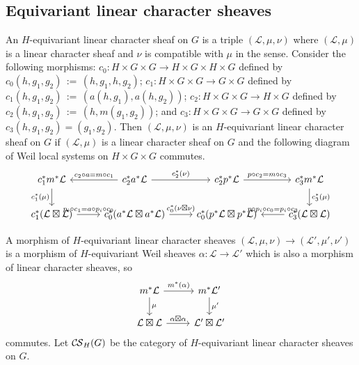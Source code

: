 \documentclass[10pt]{amsart}
\theoremstyle{plain}
\theoremstyle{definition}
\newcommand{\ceq}{{\, :=\, }}
\newcommand{\cs}[1]{{\mathcal{#1}}}
\newcommand{\CS}{{\mathcal{C\hskip-0.8pt S}}}
\begin{document}
\subsection{Equivariant linear character sheaves}

An $H$-equivariant linear character sheaf on $G$ is a triple $(\cs{L},\mu, \nu)$ where $(\cs{L},\mu)$ is a linear character sheaf and $\nu$ is compatible with $\mu$ in the sense. 
Consider the following morphisms: $c_0 : H\times G \times G\to H\times G \times H \times G$ defined by $c_0(h,g_1,g_2)\ceq(h,g_1,h,g_2)$;
$c_1 : H \times G\times G \to G\times G$ defined by $c_1(h, g_1, g_2) \ceq (a(h,g_1),a(h,g_2))$;  $c_2 : H \times G\times G \to H\times G$ defined by $c_2(h,g_1,g_2) \ceq (h, m(g_1,g_2))$; and $c_3 : H \times G\times G \to G\times G$ defined by $c_3(h, g_1, g_2) = (g_1, g_2)$. 
Then $(\cs{L},\mu,\nu)$ is an $H$-equivariant linear character sheaf on $G$ if $(\cs{L},\mu)$ is a linear character sheaf on $G$ and the following diagram of Weil local systems on $H \times G\times G$ commutes.
\[
\begin{tikzcd}
\arrow{d}[swap]{c_1^*(\mu)} c_1^* m^* \cs{L} & \arrow{l}[swap]{c_2\circ a = m\circ c_1}  c_2^* a^* \cs{L} \arrow{r}{c_2^*(\nu)} & c_2^* p^* \cs{L} \arrow{r}{p\circ c_2 = m\circ c_3}  & c_3^* m^*\cs{L} \arrow{d}{c_3^*(\mu)} \\
c_1^*(\cs{L}\boxtimes \cs{L}) \arrow{r}{p_i\circ c_1 = a\circ p_i\circ c_0} & c_0^*(a^*\cs{L}\boxtimes a^*\cs{L}) \arrow{r}{c_0^*(\nu\boxtimes \nu)} & c_0^*(p^*\cs{L} \boxtimes p^*\cs{L}) & \arrow{l}[swap]{p\circ p_i\circ c_0 = p_i \circ c_3}c_3^*(\cs{L}\boxtimes \cs{L})
\end{tikzcd}
\]
\iffalse
On stalks, this condition is
\[
\begin{tikzcd}
\arrow{d}[swap]{\mu_{(h\cdot g_1, h\cdot g_2)}} \cs{L}_{(h\cdot g_1)(h\cdot g_2)} & \arrow[equal]{l}  \cs{L}_{h\cdot(g_1 g_2)} \arrow{r}{\nu_{(h, g_2 g_2)}} & \cs{L}_{g_1 g_2} \arrow[equal]{r} & \cs{L}_{g_1 g_2} \arrow{d}{\mu_{(g_1,g_2)}} \\
\cs{L}_{h\cdot g_1}\otimes \cs{L}_{h\cdot g_2} \arrow[equal]{r} & \cs{L}_{h\cdot g_1}\otimes \cs{L}_{h\cdot g_2} \arrow{r}{\nu_{(h,g_1)}\otimes \nu_{(h,g_2)}} & \cs{L}_{g_1}\otimes \cs{L}_{g_2} & \arrow[equal]{l} \cs{L}_{g_1} \otimes \cs{L}_{g_2},
\end{tikzcd}
\]
for all $(h,g_1,g_2)\in H\times G\times G$.
\fi

A morphism of $H$-equivariant linear character sheaves $(\cs{L},\mu,\nu) \to (\cs{L}',\mu',\nu')$ is a morphism of $H$-equivariant Weil sheaves $\alpha : \cs{L}\to \cs{L}'$ which is also a morphism of linear character sheaves, so
\[
\begin{tikzcd}
\arrow{d}{\mu} m^*\cs{L} \arrow{r}{m^*(\alpha)} & m^*\cs{L}' \arrow{d}{\mu'} \\
\cs{L}\boxtimes \cs{L} \arrow{r}{\alpha\boxtimes\alpha} & \cs{L}'\boxtimes\cs{L}' 
\end{tikzcd}
\]
commutes.
%
Let $\CS_H(G)$ be the category of $H$-equivariant linear character sheaves on $G$.
\end{document}
